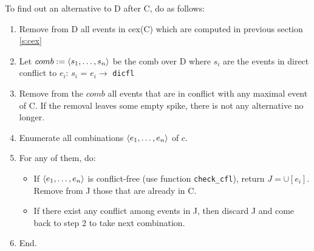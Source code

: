 \documentclass{llncs}
\begin{document}
To find out an alternative to D after C, do as follows:
\begin{enumerate}
\item
	Remove from D all events in cex(C) which are computed in previous section \cref{s:cex}
\item
	Let $comb \mathrel{:=} \langle s_1, \ldots, s_n\rangle$ be the comb over D where 
	$s_i$ are the events in direct conflict to $e_i$: $s_i$ = $e_i \rightarrow$ \verb!dicfl!
\item
	Remove from the $comb$ all events that are in conflict with any maximal event of C. If the removal leaves some empty spike, 
	there is not any alternative no longer.
\item
	Enumerate all combinations $\langle e_1, \ldots, e_n\rangle$ of $c$.
\item
	For any of them, do:
	\begin{itemize}
		\item 
    		If $\langle e_1, \ldots, e_n\rangle$ is conflict-free (use function \verb!check_cfl!), return $J = \cup [e_i]$. Remove from J those that are already in C.
   		\item
			If there exist any conflict among events in J, then discard J and come back to step 2
			to take next combination.
	\end{itemize}
\item End.
\end{enumerate}
\end{document}
